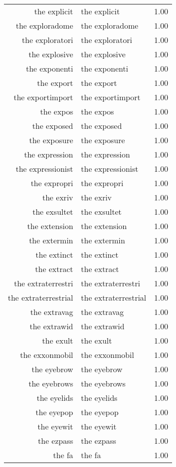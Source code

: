 \begin{table}[ht]
\begin{tabular}{rlr}
  the explicit & the explicit & 1.00 \\ 
  the exploradome & the exploradome & 1.00 \\ 
  the exploratori & the exploratori & 1.00 \\ 
  the explosive & the explosive & 1.00 \\ 
  the exponenti & the exponenti & 1.00 \\ 
  the export & the export & 1.00 \\ 
  the exportimport & the exportimport & 1.00 \\ 
  the expos & the expos & 1.00 \\ 
  the exposed & the exposed & 1.00 \\ 
  the exposure & the exposure & 1.00 \\ 
  the expression & the expression & 1.00 \\ 
  the expressionist & the expressionist & 1.00 \\ 
  the expropri & the expropri & 1.00 \\ 
  the exriv & the exriv & 1.00 \\ 
  the exsultet & the exsultet & 1.00 \\ 
  the extension & the extension & 1.00 \\ 
  the extermin & the extermin & 1.00 \\ 
  the extinct & the extinct & 1.00 \\ 
  the extract & the extract & 1.00 \\ 
  the extraterrestri & the extraterrestri & 1.00 \\ 
  the extraterrestrial & the extraterrestrial & 1.00 \\ 
  the extravag & the extravag & 1.00 \\ 
  the extrawid & the extrawid & 1.00 \\ 
  the exult & the exult & 1.00 \\ 
  the exxonmobil & the exxonmobil & 1.00 \\ 
  the eyebrow & the eyebrow & 1.00 \\ 
  the eyebrows & the eyebrows & 1.00 \\ 
  the eyelids & the eyelids & 1.00 \\ 
  the eyepop & the eyepop & 1.00 \\ 
  the eyewit & the eyewit & 1.00 \\ 
  the ezpass & the ezpass & 1.00 \\ 
  the fa & the fa & 1.00 \\ 

\end{tabular}
\end{table}
